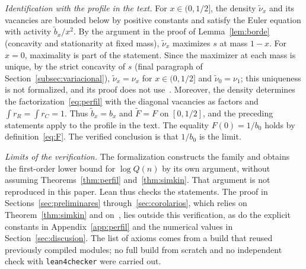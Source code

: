 \emph{Identification with the profile in the text.} For $x\in(0,1/2]$, the density $\tilde\nu_x$ and its
vacancies are bounded below by
positive constants and satisfy the Euler equation with activity $\tilde b_x/x^2$. By the argument in the
proof of Lemma~\ref{lem:borde}
(concavity and stationarity at fixed mass), $\tilde\nu_x$ maximizes $s$ at mass $1-x$. For $x=0$, maximality
is part of the statement.
Since the maximizer at each mass is unique, by the strict concavity of $s$ (final paragraph of
Section~\ref{subsec:variacional}),
$\tilde\nu_x=\nu_x$ for $x\in(0,1/2]$ and $\tilde\nu_0=\nu_1$; this uniqueness is not formalized, and its
proof does not
use~\cite{Perfil}. Moreover, the density determines the factorization~\eqref{eq:perfil}
with the diagonal vacancies as factors and $\int r_R=\int r_C=1$. Thus $\tilde b_x=b_x$ and $\tilde F=F$ on
$[0,1/2]$, and the
preceding statements apply to the profile in the text. The equality $F(0)=1/b_0$ holds by
definition~\eqref{eq:F}. The verified conclusion is
that $1/b_0$ is the limit.

\emph{Limits of the verification.} The formalization constructs the family and obtains the first-order lower
bound for $\log Q(n)$ by
its own argument, without assuming Theorems~\ref{thm:perfil} and~\ref{thm:simkin}. That argument is not
reproduced in this paper. Lean
thus checks the statements. The proof in Sections~\ref{sec:preliminares} through~\ref{sec:corolarios}, which
relies on
Theorem~\ref{thm:simkin} and on~\cite{Perfil}, lies outside this verification, as do the explicit constants
in
Appendix~\ref{app:perfil} and the numerical values in Section~\ref{sec:discusion}. The list of axioms comes
from a build that reused
previously compiled modules; no full build from scratch and no independent check with \texttt{lean4checker}
were carried out.

